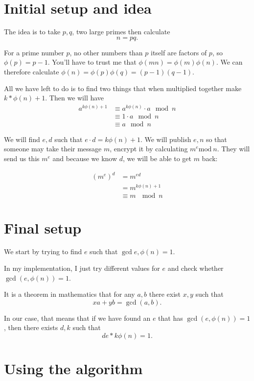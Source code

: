 \documentclass{article}
\begin{document}
\section{Initial setup and idea}
 The idea is to take $p,q$, two large primes
 then calculate \[n = pq.\]

 For a prime number $p$, no other numbers than $p$ itself are factors of $p$, so $\phi(p) = p-1$.  You'll have to trust me that $\phi(mn) = \phi(m)\phi(n)$.  We can therefore calculate $\phi(n) = \phi(p)\phi(q) = (p-1)(q-1)$.
 

 All we have left to do is to find two things that when multiplied together make $k*\phi(n) + 1$.
 Then we will have 
\begin{align}
    a^{k\phi(n) + 1} &\equiv a^{k\phi(n)}\cdot a \mod{n} \\
                     &\equiv 1 \cdot a \mod{n} \\
                     &\equiv a \mod{n}
\end{align}

We will find $e,d$ such that $e\cdot d = k\phi(n) + 1$.  We will publish $e,n$ so that someone may take their message $m$, encrypt it by calculating $m^e \mathrm{mod}\ n$.  They will send us this $m^e$ and because we know $d$, we will be able to get $m$ back:

\begin{align}
    (m^e)^d &= m^{ed} \\
            &= m^{k\phi(n) + 1} \\
            &\equiv m\ \mod{n}
\end{align}

\section{Final setup}

 We start by trying to find $e$ such that $\gcd{e,\phi(n)} = 1$.
 
In my implementation, I just try different values for $e$ and check whether $\gcd(e, \phi(n)) = 1$.

It is a theorem in mathematics that for any $a, b$ there exist $x, y$ such that
\[xa + yb = \gcd(a,b).\]

In our case, that means that if we have found an $e$ that has $\gcd(e, \phi(n)) = 1$, then there exists $d,k$ such that
\[de * k\phi(n) = 1.\]

\section{Using the algorithm}
\end{document}
